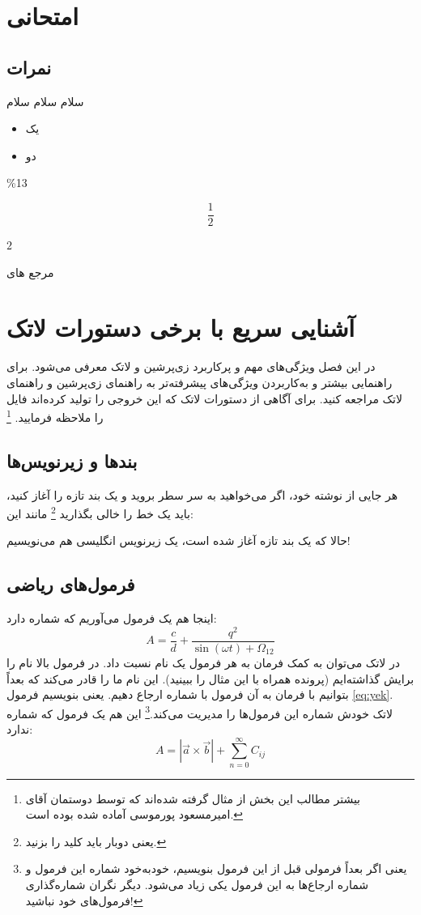 \chapter{امتحانی}
\section{نمرات}
سلام سلام سلام%
\begin{itemize}
	\item یک
	\item دو
\end{itemize}

\%13 

\begin{equation}
\frac{1}{2}
\end{equation}

$2$

مرجع های 
\cite{Amintoosi09regional,Baker02limits}

\chapter{آشنایی سریع با برخی دستورات لاتک}\label{Chap:latexIntro}
در این فصل ویژگی‌های مهم و پرکاربرد زی‌پرشین و لاتک معرفی می‌شود. برای راهنمایی بیشتر و به‌کاربردن ویژگی‌های پیشرفته‌تر به راهنمای زی‌پرشین و راهنمای لاتک مراجعه کنید. برای آگاهی از دستورات لاتک که این خروجی را تولید کرده‌اند فایل  را ملاحظه فرمایید.
\footnote{بیشتر مطالب این بخش از مثال 
	گرفته شده‌اند که توسط دوستمان آقای امیرمسعود پورموسی آماده شده بوده است.}

\section{بندها و زیرنویس‌ها}
هر جایی از نوشته خود، اگر می‌خواهید به سر سطر بروید و یک بند تازه را آغاز کنید، باید یک خط را خالی بگذارید
\footnote{یعنی دوبار باید کلید  را بزنید.}
مانند این:

حالا که یک بند تازه آغاز شده است، یک زیرنویس انگلیسی
هم می‌نویسیم!
\section{فرمول‌های ریاضی}\label{formula}

اینجا هم یک فرمول می‌آوریم که شماره دارد:
\begin{equation}\label{eq:yek}
A=\frac{c}{d}+\frac{q^2}{\sin(\omega t)+\Omega_{12}}
\end{equation}
در لاتک می‌توان به کمک فرمان 
به هر فرمول یک نام نسبت داد. در فرمول بالا نام  را برایش گذاشته‌ایم (پرونده  همراه با این مثال را ببینید). این نام ما را قادر می‌کند که بعداً بتوانیم با فرمان
به آن فرمول با شماره ارجاع دهیم. یعنی بنویسیم فرمول \ref{eq:yek}. 
لاتک خودش شماره این فرمول‌ها را مدیریت می‌کند.\footnote{یعنی اگر بعداً فرمولی قبل از این فرمول بنویسیم، خودبه‌خود شماره این فرمول و شماره ارجاع‌ها به این فرمول یکی زیاد می‌شود. دیگر نگران شماره‌گذاری فرمول‌های خود نباشید!} این هم یک فرمول که شماره ندارد:
$$A=|\vec{a}\times \vec{b}| + \sum_{n=0}^\infty C_{ij}$$

